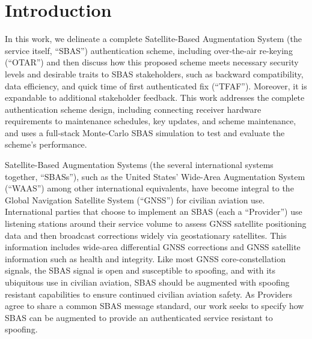 \documentclass[APA,STIX1COL]{IONjournal/ION-APA Template}
\begin{document}
\maketitle


\section{Introduction} \label{sec:introduction}

	In this work, we delineate a complete Satellite-Based Augmentation System (the service itself, ``SBAS'') authentication scheme, including over-the-air re-keying (``OTAR'') and then discuss how this proposed scheme meets necessary security levels and desirable traits to SBAS stakeholders, such as backward compatibility, data efficiency, and quick time of first authenticated fix (``TFAF'').
	Moreover, it is expandable to additional stakeholder feedback.
	This work addresses the complete authentication scheme design, including connecting receiver hardware requirements to maintenance schedules, key updates, and scheme maintenance, and uses a full-stack Monte-Carlo SBAS simulation to test and evaluate the scheme's performance.

	Satellite-Based Augmentation Systems (the several international systems together, ``SBASs''), such as the United States' Wide-Area Augmentation System (``WAAS'') among other international equivalents, have become integral to the Global Navigation Satellite System (``GNSS'') for civilian aviation use.
	International parties that choose to implement an SBAS (each a ``Provider'') use listening stations around their service volume to assess GNSS satellite positioning data and then broadcast corrections widely via geostationary satellites.
	This information includes wide-area differential GNSS corrections and GNSS satellite information such as health and integrity.
	Like most GNSS core-constellation signals, the SBAS signal is open and susceptible to spoofing, and with its ubiquitous use in civilian aviation, SBAS should be augmented with spoofing resistant capabilities to ensure continued civilian aviation safety.
	As Providers agree to share a common SBAS message standard, our work seeks to specify how SBAS can be augmented to provide an authenticated service resistant to spoofing.
\end{document}

